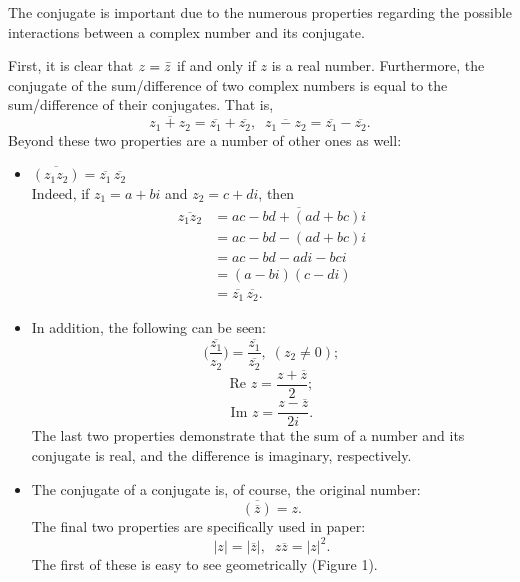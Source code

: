 The conjugate is important due to the numerous properties regarding the possible interactions between a complex number and its conjugate.

\begin{example}
First, it is clear that $z=\bar{z}$ if and only if $z$ is a real number.  Furthermore, the conjugate of the sum/difference of two complex numbers is equal to the sum/difference of their conjugates.  That is,
\[\overbar{z_1 + z_2} = \overbar{z_1} + \overbar{z_2}, \;\; \overbar{z_1 - z_2} = \overbar{z_1} - \overbar{z_2}.\]
Beyond these two properties are a number of other ones as well:
\begin{itemize}
\item $\overbar{(z_1z_2)} = \overbar{z_1}\,\overbar{z_2}$\\
Indeed, if $z_1 = a+bi$ and $z_2 = c+di$, then
\vspace{-1em}
\begin{align*}
\overbar{z_1z_2} &= \overbar{ac - bd + (ad + bc)i}\\
&= ac - bd - (ad + bc)i\\
&= ac - bd - adi - bci\\
&= (a - bi)(c-di)\\
&= \overbar{z_1}\,\overbar{z_2}.
\end{align*}
\item In addition, the following can be seen:
\[\overbar{\biggl(\frac{z_1}{z_2}\biggr)} = \frac{\overbar{z_1}}{\overbar{z_2}}, \; (z_2 \neq 0);\]
\[\textrm{Re } z = \frac{z+\overbar{z}}{2};\]
\[\textrm{Im } z = \frac{z-\overbar{z}}{2i}.\]
The last two properties demonstrate that the sum of a number and its conjugate is real, and the difference is imaginary, respectively.
\item The conjugate of a conjugate is, of course, the original number:
\[\overbar{(\overbar{z})} = z.\]
The final two properties are specifically used in \authorsetals paper:
\[|z| = |\overbar{z}|, \;\; z\overbar{z} = |z|^2.\]
The first of these is easy to see geometrically (Figure 1).


\end{itemize}
\end{example}
